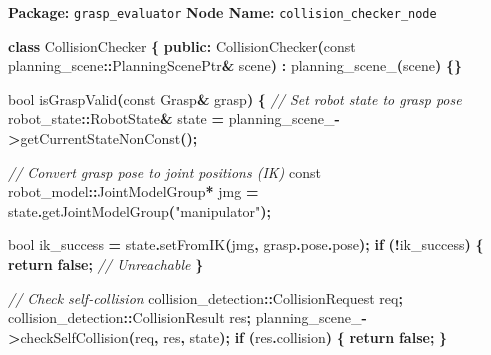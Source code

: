 \documentclass[
]{article}
\newenvironment{Shaded}{\begin{snugshade}}{\end{snugshade}}
\newcommand{\AttributeTok}[1]{\textcolor[rgb]{0.13,0.29,0.53}{#1}}
\newcommand{\CommentTok}[1]{\textcolor[rgb]{0.56,0.35,0.01}{\textit{#1}}}
\newcommand{\ControlFlowTok}[1]{\textcolor[rgb]{0.13,0.29,0.53}{\textbf{#1}}}
\newcommand{\DataTypeTok}[1]{\textcolor[rgb]{0.13,0.29,0.53}{#1}}
\newcommand{\KeywordTok}[1]{\textcolor[rgb]{0.13,0.29,0.53}{\textbf{#1}}}
\newcommand{\NormalTok}[1]{#1}
\newcommand{\OperatorTok}[1]{\textcolor[rgb]{0.81,0.36,0.00}{\textbf{#1}}}
\newcommand{\StringTok}[1]{\textcolor[rgb]{0.31,0.60,0.02}{#1}}
\newcommand{\VariableTok}[1]{\textcolor[rgb]{0.00,0.00,0.00}{#1}}
\begin{document}
\textbf{Package:} \texttt{grasp\_evaluator} \textbf{Node Name:}
\texttt{collision\_checker\_node}

\begin{Shaded}
\begin{Highlighting}[]
\KeywordTok{class}\NormalTok{ CollisionChecker }\OperatorTok{\{}
\KeywordTok{public}\OperatorTok{:}
\NormalTok{    CollisionChecker}\OperatorTok{(}\AttributeTok{const}\NormalTok{ planning\_scene}\OperatorTok{::}\NormalTok{PlanningScenePtr}\OperatorTok{\&}\NormalTok{ scene}\OperatorTok{)}
        \OperatorTok{:} \VariableTok{planning\_scene\_}\OperatorTok{(}\NormalTok{scene}\OperatorTok{)} \OperatorTok{\{\}}

    \DataTypeTok{bool}\NormalTok{ isGraspValid}\OperatorTok{(}\AttributeTok{const}\NormalTok{ Grasp}\OperatorTok{\&}\NormalTok{ grasp}\OperatorTok{)} \OperatorTok{\{}
        \CommentTok{// Set robot state to grasp pose}
\NormalTok{        robot\_state}\OperatorTok{::}\NormalTok{RobotState}\OperatorTok{\&}\NormalTok{ state }\OperatorTok{=} \VariableTok{planning\_scene\_}\OperatorTok{{-}\textgreater{}}\NormalTok{getCurrentStateNonConst}\OperatorTok{();}

        \CommentTok{// Convert grasp pose to joint positions (IK)}
        \AttributeTok{const}\NormalTok{ robot\_model}\OperatorTok{::}\NormalTok{JointModelGroup}\OperatorTok{*}\NormalTok{ jmg }\OperatorTok{=}
\NormalTok{            state}\OperatorTok{.}\NormalTok{getJointModelGroup}\OperatorTok{(}\StringTok{"manipulator"}\OperatorTok{);}

        \DataTypeTok{bool}\NormalTok{ ik\_success }\OperatorTok{=}\NormalTok{ state}\OperatorTok{.}\NormalTok{setFromIK}\OperatorTok{(}\NormalTok{jmg}\OperatorTok{,}\NormalTok{ grasp}\OperatorTok{.}\NormalTok{pose}\OperatorTok{.}\NormalTok{pose}\OperatorTok{);}
        \ControlFlowTok{if} \OperatorTok{(!}\NormalTok{ik\_success}\OperatorTok{)} \OperatorTok{\{}
            \ControlFlowTok{return} \KeywordTok{false}\OperatorTok{;}  \CommentTok{// Unreachable}
        \OperatorTok{\}}

        \CommentTok{// Check self{-}collision}
\NormalTok{        collision\_detection}\OperatorTok{::}\NormalTok{CollisionRequest req}\OperatorTok{;}
\NormalTok{        collision\_detection}\OperatorTok{::}\NormalTok{CollisionResult res}\OperatorTok{;}
        \VariableTok{planning\_scene\_}\OperatorTok{{-}\textgreater{}}\NormalTok{checkSelfCollision}\OperatorTok{(}\NormalTok{req}\OperatorTok{,}\NormalTok{ res}\OperatorTok{,}\NormalTok{ state}\OperatorTok{);}
        \ControlFlowTok{if} \OperatorTok{(}\NormalTok{res}\OperatorTok{.}\NormalTok{collision}\OperatorTok{)} \OperatorTok{\{}
            \ControlFlowTok{return} \KeywordTok{false}\OperatorTok{;}
        \OperatorTok{\}}


\end{Highlighting}
\end{Shaded}
\end{document}
